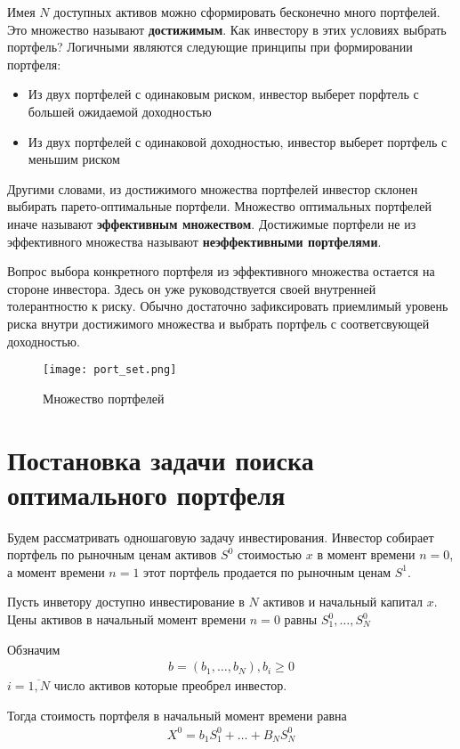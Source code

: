Имея $N$ доступных активов можно сформировать бесконечно много портфелей. Это множество называют \textbf{достижимым}. 
Как инвестору в этих условиях выбрать портфель? Логичными являются следующие принципы при формировании портфеля:
\begin{itemize}
	\item Из двух портфелей с одинаковым риском, инвестор выберет порфтель с большей ожидаемой доходностью
	\item Из двух портфелей с одинаковой доходностью, инвестор выберет портфель с меньшим риском
\end{itemize}
Другими словами, из достижимого множества портфелей инвестор склонен выбирать парето-оптимальные портфели.
Множество оптимальных портфелей иначе называют \textbf{эффективным множеством}. Достижимые портфели не из 
эффективного множества называют \textbf{неэффективными портфелями}.

Вопрос выбора конкретного портфеля из эффективного множества остается на стороне инвестора. Здесь он уже руководствуется
своей внутренней толерантностю к риску. Обычно достаточно зафиксировать приемлимый уровень риска внутри достижимого множества
и выбрать портфель с соответсвующей доходностью. 

\begin{figure}[H]
	\centering
	\texttt{[image: port\_set.png]}
	\caption{Множество портфелей}
	\label{fig:port_set}
\end{figure}

\section{Постановка задачи поиска оптимального портфеля}

Будем рассматривать одношаговую задачу инвестирования. Инвестор собирает портфель по рыночным ценам активов $S^0$
стоимостью $x$ в момент времени $n=0$, а момент времени $n=1$ этот портфель продается по рыночным ценам $S^1$.

Пусть инветору доступно инвестирование в $N$ активов и начальный капитал $x$. 
Цены активов в начальный момент времени $n=0$ равны
$S_1^0, \dots, S_N^0$

Обзначим 
\begin{align}
	b = (b_1, \dots, b_N), b_i \ge 0
\end{align}
$i=\overline{1, N}$ число активов которые преобрел инвестор.

Тогда стоимость портфеля в начальный момент времени равна
\begin{align}
	X^0 = b_1 S_1^0 + \dots + B_N S_N^0
\end{align}

